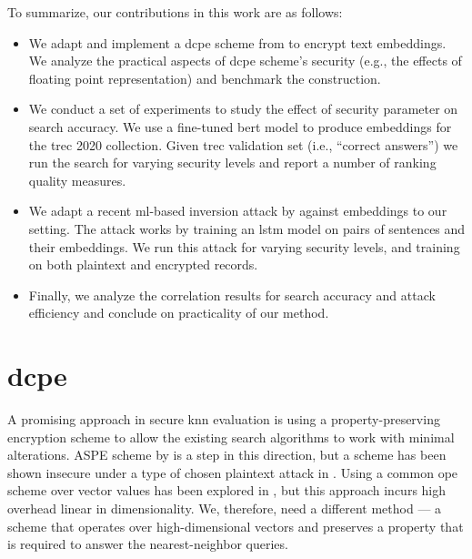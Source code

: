 		To summarize, our contributions in this work are as follows:
		\begin{itemize}
			\item
				We adapt and implement a \acrfull{dcpe} scheme from \cite{dcpe} to encrypt text embeddings.
				We analyze the practical aspects of \acrshort{dcpe} scheme's security (e.g., the effects of floating point representation) and benchmark the construction.

			\item
				We conduct a set of experiments to study the effect of security parameter on search accuracy.
				We use a fine-tuned \acrshort{bert} model to produce embeddings for the \acrshort{trec} 2020 collection.
				Given \acrshort{trec} validation set (i.e., ``correct answers'') we run the search for varying security levels and report a number of ranking quality measures.

			\item
				We adapt a recent \acrshort{ml}-based inversion attack by \textcite{embedding-attacks} against embeddings to our setting.
				The attack works by training an \acrshort{lstm} model on pairs of sentences and their embeddings.
				We run this attack for varying security levels, and training on both plaintext and encrypted records.

			\item
				Finally, we analyze the correlation results for search accuracy and attack efficiency and conclude on practicality of our method.
		\end{itemize}

	\section{\texorpdfstring{\acrlong{dcpe}}{Distance Comparison Preserving Encryption}}

		A promising approach in secure \acrshort{knn} evaluation is using a property-preserving encryption scheme to allow the existing search algorithms to work with minimal alterations.
		ASPE scheme by \textcite{knn-aspe} is a step in this direction, but a scheme has been shown insecure under a type of chosen plaintext attack in \cite{secure-nn-revisited-break-aspe}.
		Using a common \acrshort{ope} scheme over vector values has been explored in \cite{quick-n}, but this approach incurs high overhead linear in dimensionality.
		We, therefore, need a different method --- a scheme that operates over high-dimensional vectors and preserves a property that is required to answer the nearest-neighbor queries.

